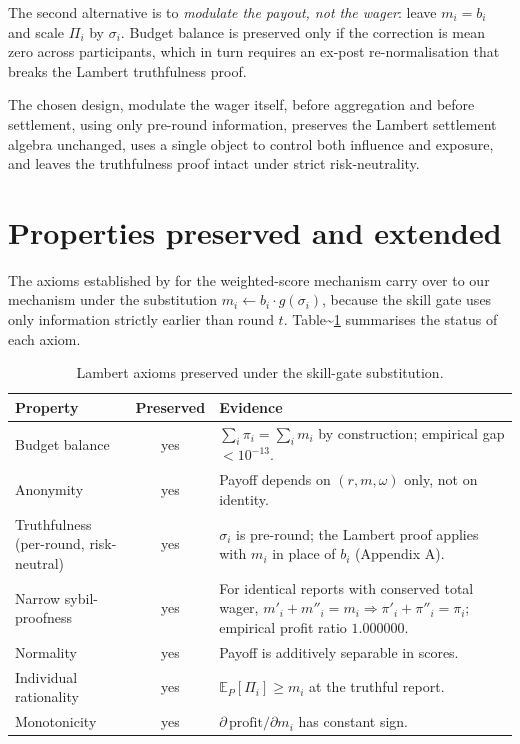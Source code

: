 \documentclass[
  11pt,
  a4paper,
  oneside]{report}
\begin{document}
The second alternative is to \emph{modulate the payout, not the
wager}: leave \(m_i = b_i\) and scale \(\Pi_i\) by \(\sigma_i\). Budget
balance is preserved only if the correction is mean zero across
participants, which in turn requires an ex-post re-normalisation that
breaks the Lambert truthfulness proof.

The chosen design, modulate the wager itself, before aggregation and
before settlement, using only pre-round information, preserves the
Lambert settlement algebra unchanged, uses a single object to control
both influence and exposure, and leaves the truthfulness proof intact
under strict risk-neutrality.

\section{Properties preserved and
extended}\label{properties-preserved-and-extended}

The axioms established by \citet{lambert2008selffinanced} for the
weighted-score mechanism carry over to our mechanism under the
substitution \(m_i \leftarrow b_i \cdot g(\sigma_i)\), because the skill
gate uses only information strictly earlier than round \(t\).
Table\textasciitilde{}\ref{tab:axiom-preservation} summarises the status
of each axiom.

\begin{table}[h]
\centering
\small
\begin{tabular}{p{5.5cm}cp{6cm}}
\toprule
Property & Preserved & Evidence \\
\midrule
Budget balance & yes
  & $\sum_i \pi_i = \sum_i m_i$ by construction; empirical gap
    $< 10^{-13}$. \\
Anonymity & yes
  & Payoff depends on $(r, m, \omega)$ only, not on identity. \\
Truthfulness (per-round, risk-neutral) & yes
  & $\sigma_i$ is pre-round; the Lambert proof applies with $m_i$ in
    place of $b_i$ (Appendix A). \\
Narrow sybil-proofness & yes
  & For identical reports with conserved total wager,
    $m'_i + m''_i = m_i \Rightarrow \pi'_i + \pi''_i = \pi_i$;
    empirical profit ratio $1.000000$. \\
Normality & yes
  & Payoff is additively separable in scores. \\
Individual rationality & yes
  & $\mathbb{E}_P[\Pi_i] \geq m_i$ at the truthful report. \\
Monotonicity & yes
  & $\partial\,\mathrm{profit}/\partial m_i$ has constant sign. \\
\bottomrule
\end{tabular}
\caption{Lambert axioms preserved under the skill-gate substitution.}
\label{tab:axiom-preservation}
\end{table}
\end{document}
